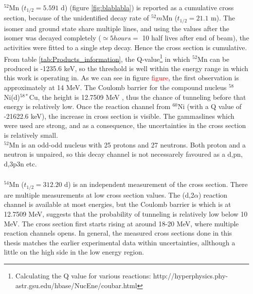 \documentclass[a4paper,11pt,twoside]{book}
\begin{document}
\subsubsection{}
$^{52}$Mn ($t_{1/2}=5.591$ d) (figure \ref{fig:blablabla}) is reported as a cumulative cross section, because of the unidentified decay rate of $^{52}m$Mn ($t_{1/2}=21.1$ m). The isomer and ground state share multiple lines, and using the values after the isomer was decayed completely ($\simeq 5 hours =$ 10 half lives after end of beam), the activities were fitted to a single step decay. Hence the cross section is cumulative. From table \ref{tab:Products_information}, the Q-value\footnote{Calculating the Q value for various reactions: http://hyperphysics.phy-astr.gsu.edu/hbase/NucEne/coubar.html} in which $^{52}$Mn can be produced is -1235.6 keV, so the threshold is well within the energy range in which this work is operating in. As we can see in figure \textcolor{red}{figure}, the first observation is approximately at 14 MeV. The Coulomb barrier for the compound nucleus $^{58}$Ni(d)$^{58*}$Cu, the height is 12.7509 MeV \textcolor{(calculated from equation in theory)}, thus the chance of tunneling before that energy is relatively low. Once the reaction channel from $^{60}$Ni (with a Q value of -21622.6 keV), the increase in cross section is visible. The gammaslines which were used are strong, and as a consequence, the uncertainties in the cross section is relatively small. \\ 

$^{52}$Mn is an odd-odd nucleus with 25 protons and 27 neutrons. Both proton and a neutron is unpaired, so this decay channel is not necessarely favoured as a d,pn, d,3p3n etc. 

 
\subsubsection{}
$^{54}$Mn ($t_{1/2}=312.20$ d) is an independent measurement of the cross section. There are multiple measurements at low cross section values.  The (d,2$\alpha$) reaction channel is available at most energies, but the Coulomb barrier is which is at 12.7509 MeV, suggests that the probability of tunneling is relatively low below 10 MeV. The cross section first starts rising at around 18-20 MeV, where multiple reaction channels opens. In general, the measured cross sections done in this thesis matches the earlier experimental data within uncertainties, allthough a little on the high side in the low energy region. 
\end{document}
